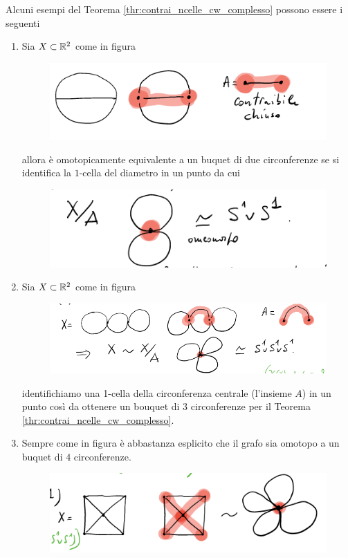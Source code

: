 \begin{remark}
	Alcuni esempi del Teorema \ref{thr:contrai_ncelle_cw_complesso} possono essere i seguenti
	\begin{enumerate}
		\item Sia $X \subset \mathbb{R}^2$ come in figura 
		\begin{figure}[h]
			\centering
			\includegraphics[width=0.6\linewidth]{images/topologia_algebrica/CWCOMPLEXEsempio1}
			\caption{}
			\label{fig:cwcomplexesempio1}
		\end{figure}
		allora è omotopicamente equivalente a un buquet di due circonferenze se si identifica la $1$-cella del diametro in un punto da cui
		\begin{figure}[h]
			\centering
			\includegraphics[width=0.6\linewidth]{images/topologia_algebrica/CWCOMPLEXEsempio2}
			\caption{}
			\label{fig:cwcomplexesempio2}
		\end{figure}
		\item Sia $X \subset \mathbb{R}^2$ come in figura 
			\begin{figure}[h]
				\centering
				\includegraphics[width=0.7\linewidth]{images/topologia_algebrica/CWCOMPLEXEsempio3.png}
				\caption{}
				\label{fig:cwcomplexesempio3}
			\end{figure}
			identifichiamo una 1-cella della circonferenza centrale (l'insieme $A$) in un punto così da ottenere un bouquet di $3$ circonferenze per il Teorema \ref{thr:contrai_ncelle_cw_complesso}.   
		\item Sempre come in figura è abbastanza esplicito  che il grafo sia omotopo a un buquet di $4$ circonferenze.
			\begin{figure}[h]
				\centering
				\includegraphics[width=0.7\linewidth]{images/topologia_algebrica/CWCOMPLEXEsempio8.png}

\end{figure}
\end{enumerate}
\end{remark}
